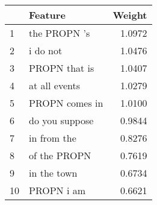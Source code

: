 \begin{tabular}{llr}
\toprule
{} &         Feature &  Weight \\
\midrule
1  &    the PROPN 's &  1.0972 \\
2  &        i do not &  1.0476 \\
3  &   PROPN that is &  1.0407 \\
4  &   at all events &  1.0279 \\
5  &  PROPN comes in &  1.0100 \\
6  &  do you suppose &  0.9844 \\
7  &     in from the &  0.8276 \\
8  &    of the PROPN &  0.7619 \\
9  &     in the town &  0.6734 \\
10 &      PROPN i am &  0.6621 \\
\bottomrule
\end{tabular}
